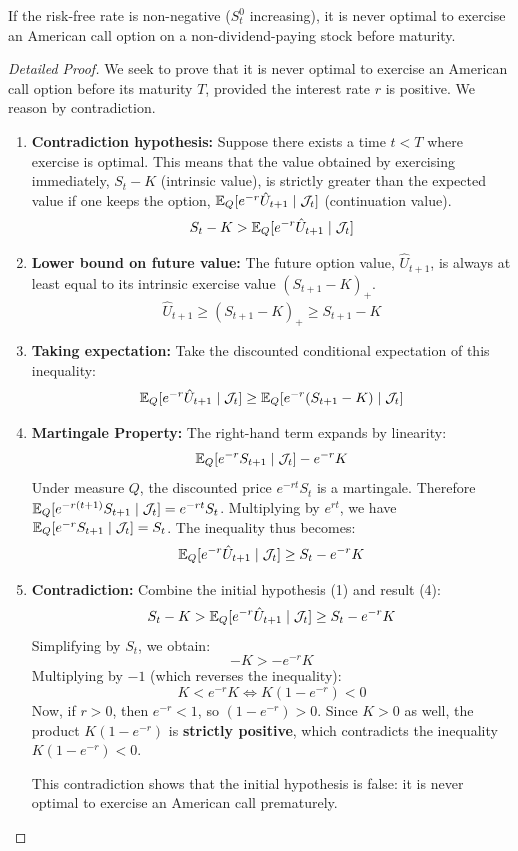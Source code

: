 \begin{proposition}
If the risk-free rate is non-negative ($S_t^0$ increasing), it is never optimal to exercise an American call option on a non-dividend-paying stock before maturity.
\end{proposition}

\begin{proof}[Detailed Proof]
We seek to prove that it is never optimal to exercise an American call option before its maturity $T$, provided the interest rate $r$ is positive. We reason by contradiction.

\begin{enumerate}
    \item \textbf{Contradiction hypothesis:} Suppose there exists a time $t < T$ where exercise is optimal. This means that the value obtained by exercising immediately, $S_t - K$ (intrinsic value), is strictly greater than the expected value if one keeps the option, $\mathbb{E}_Q[e^{-r} \hat{U}_{t+1} \mid \mathcal{J}_t]$ (continuation value).
    \[
    S_t - K > \mathbb{E}_Q[e^{-r} \hat{U}_{t+1} \mid \mathcal{J}_t]
    \]
    
    \item \textbf{Lower bound on future value:} The future option value, $\hat{U}_{t+1}$, is always at least equal to its intrinsic exercise value $(S_{t+1} - K)_+$.
    \[
    \hat{U}_{t+1} \ge (S_{t+1} - K)_+ \ge S_{t+1} - K
    \]
    
    \item \textbf{Taking expectation:} Take the discounted conditional expectation of this inequality:
    \[
    \mathbb{E}_Q[e^{-r} \hat{U}_{t+1} \mid \mathcal{J}_t] \ge \mathbb{E}_Q[e^{-r} (S_{t+1} - K) \mid \mathcal{J}_t]
    \]
    
    \item \textbf{Martingale Property:} The right-hand term expands by linearity:
    \[
    \mathbb{E}_Q[e^{-r} S_{t+1} \mid \mathcal{J}_t] - e^{-r} K
    \]
    Under measure $Q$, the discounted price $e^{-rt} S_t$ is a martingale. Therefore $\mathbb{E}_Q[e^{-r(t+1)}S_{t+1} \mid \mathcal{J}_t] = e^{-rt}S_t$. Multiplying by $e^{rt}$, we have $\mathbb{E}_Q[e^{-r} S_{t+1} \mid \mathcal{J}_t] = S_t$.
    The inequality thus becomes:
    \[
    \mathbb{E}_Q[e^{-r} \hat{U}_{t+1} \mid \mathcal{J}_t] \ge S_t - e^{-r} K
    \]
    
    \item \textbf{Contradiction:} Combine the initial hypothesis (1) and result (4):
    \[
    S_t - K > \mathbb{E}_Q[e^{-r} \hat{U}_{t+1} \mid \mathcal{J}_t] \ge S_t - e^{-r} K
    \]
    Simplifying by $S_t$, we obtain:
    \[
    -K > -e^{-r} K
    \]
    Multiplying by $-1$ (which reverses the inequality):
    \[
    K < e^{-r} K \iff K(1 - e^{-r}) < 0
    \]
    Now, if $r > 0$, then $e^{-r} < 1$, so $(1 - e^{-r}) > 0$. Since $K > 0$ as well, the product $K(1 - e^{-r})$ is \textbf{strictly positive}, which contradicts the inequality $K(1 - e^{-r}) < 0$.
    
    This contradiction shows that the initial hypothesis is false: it is never optimal to exercise an American call prematurely.
\end{enumerate}
\end{proof}

